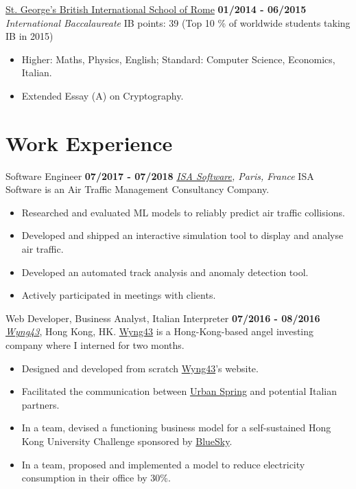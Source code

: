 \documentclass[]{friggeri-cv}
\begin{document}
\begin{entrylist}
\begin{itemize}
    \end{itemize}
  \entry
    {}
    {\href{http://www.stgeorge.school.it/}{St. George's British International School of Rome}}
    {\textbf{01/2014 - 06/2015}}
    {\emph{International Baccalaureate}}
    {IB points: 39  (Top 10 \% of worldwide students taking IB in 2015)}
    \begin{itemize}
        \item Higher: Maths, Physics, English; Standard: Computer Science, Economics, Italian.
        \item Extended Essay (A) on Cryptography.
    \end{itemize}
\end{entrylist}

\section{\color{red}Work \color{gray} Experience}
\begin{entrylist}
  \entry
    {}
    {Software Engineer}
    {\textbf{07/2017 - 07/2018}}
    {\emph{\href{https://www.isa-software.com}{ISA Software}, Paris, France}}
    ISA Software is an Air Traffic Management Consultancy Company.
    \begin{itemize}
        \item Researched and evaluated ML models to reliably predict air traffic collisions.
        \item Developed and shipped an interactive simulation tool to display and analyse air traffic.
        \item Developed an automated track analysis and anomaly detection tool.
        \item Actively participated in meetings with clients.
    \end{itemize}
    
\end{entrylist}
\begin{entrylist}
  \entry
    {}
    {Web Developer, Business Analyst, Italian Interpreter}
    {\textbf{07/2016 - 08/2016}}
    {\emph{\href{http://www.wyng43.com/}{Wyng43}}, Hong Kong, HK}.
    {\href{http://www.wyng43.com/}{Wyng43}} is a Hong-Kong-based angel investing company where I interned for two months.
    \begin{itemize}
        \item Designed and developed from scratch \href{http://www.wyng43.com/}{Wyng43}'s website.
        \item Facilitated the communication between \href{http://www.urbanspring.hk/}{Urban Spring} and potential Italian partners.
        \item In a team, devised a functioning business model for a self-sustained Hong Kong University Challenge sponsored by \href{http://www.hibluesky.co/}{BlueSky}.
        \item In a team, proposed and implemented a model to reduce electricity consumption in their office by 30\%.
    \end{itemize}
\end{entrylist}
\clearpage
\newpage
\end{document}
